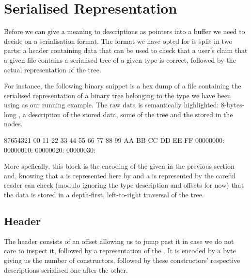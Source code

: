 \section{Serialised Representation}\label{sec:hexdump}

Before we can give a meaning to descriptions as pointers into a buffer we
need to decide on a serialisation format.
%
The format we have opted for is split in two parts: a header containing
data that can be used to check that a user's claim that a given file
contains a serialised tree of a given type is correct, followed by the
actual representation of the tree.


For instance, the following binary snippet is a hex dump of a file
containing the serialised representation of a binary tree belonging to
the type we have been using as our running example.
%
The raw data is semantically highlighted:
8-bytes-long ,
a  description of the stored data,
some  of the tree
and the  stored in the nodes.

\begin{hexdump}
87654321\hphantom{:} 00 11 22 33 44 55 66 77 88 99 AA BB CC DD EE FF
00000000:   
00000010:   
00000020:         
00000030:     
\end{hexdump}

More spefically, this block is the encoding of the 
given in the previous section and,
%
knowing that a  is represented here by 
and a  is represented by 
%
the careful reader can check
(modulo ignoring the type description and offsets for now)
that the data is stored in a depth-first, left-to-right traversal of the tree.


\subsection{Header}

The header consists of an offset allowing us to jump past it in case we do
not care to inspect it, followed by a representation of the .
%
It is encoded by a byte giving us the number of constructors, followed by
these constructors' respective descriptions serialised one after the other.

